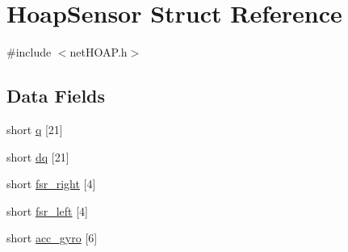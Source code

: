 \hypertarget{struct_hoap_sensor}{\section{Hoap\-Sensor Struct Reference}
\label{struct_hoap_sensor}
}


{\ttfamily \#include $<$net\-H\-O\-A\-P.\-h$>$}

\subsection*{Data Fields}
\begin{DoxyCompactItemize}
\item 
short \hyperlink{struct_hoap_sensor_af901d9eeb7e1a1c873559735d52cf4ac}{q} \mbox{[}21\mbox{]}
\item 
short \hyperlink{struct_hoap_sensor_af35afccdff23028eafd9d98618889e5a}{dq} \mbox{[}21\mbox{]}
\item 
short \hyperlink{struct_hoap_sensor_aa0f02e265b9e527d54facdaea6b2109d}{fsr\-\_\-right} \mbox{[}4\mbox{]}
\item 
short \hyperlink{struct_hoap_sensor_a4a53c736da995b3c5d2d55d0db4d6bf7}{fsr\-\_\-left} \mbox{[}4\mbox{]}
\item 
short \hyperlink{struct_hoap_sensor_a384297bd2700be586666b28c6c89fad9}{acc\-\_\-gyro} \mbox{[}6\mbox{]}
\end{DoxyCompactItemize}


